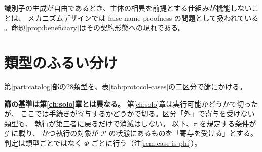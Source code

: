識別子の生成が自由であるとき、主体の相異を前提とする仕組みが機能しないことは、
メカニズムデザインでは false-name-proofness の問題として扱われている
\cite{yokoo2004}。命題\ref{prop:beneficiary}はその契約形態への現れである。

\section{類型のふるい分け}
\label{sec:protocol-filter}

第\ref{part:catalog}部の28類型を、表\ref{tab:protocol-cases}の二区分で篩にかける。

\textbf{篩の基準は第\ref{ch:solo}章とは異なる。} 第\ref{ch:solo}章は実行可能かどうかで切ったが、
ここでは手続きが寄与するかどうかで切る。区分「外」で寄与を受けない類型も、
執行が第三者に戻るだけで消滅はしない。
以下、$\pi$ を規定する条件が $\mathcal{G}$ に載り、
かつ執行の対象が $\mathcal{P}$ の状態にあるものを「寄与を受ける」とする。
判定は類型ごとではなく $\Phi$ ごとに行う（注\ref{rem:case-is-phi}）。

